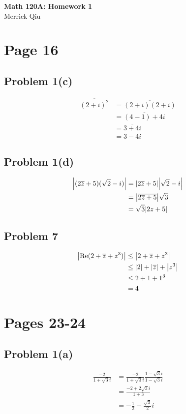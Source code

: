 \documentclass{article}
\newcommand{\cjg}[1]{\overline{#1}}
\begin{document}
\begin{center}
	\huge{\bf Math 120A: Homework 1} \\
	Merrick Qiu
\end{center}
\section*{Page 16}
\subsection*{Problem 1(c)}
\begin{align*}
	\overline{(2+i)^2} &= \overline{(2+i)(2+i)}\\
	&= \overline{(4-1)+4i} \\
	&= \overline{3+4i} \\
	&= 3-4i
\end{align*}

\subsection*{Problem 1(d)}
\begin{align*}
	\abs{(2\cjg{z}+5)(\sqrt{2}-i)} &= \abs{2\cjg{z}+5}\abs{\sqrt{2}-i}\\
	&= \abs{\cjg{2\cjg{z}+5}}\sqrt{3} \\
	&= \sqrt{3} \abs{2z+5}
\end{align*}

\subsection*{Problem 7}
\begin{align*}
	\abs{\Re(2+\cjg{z}+z^3)} &\leq \abs{2+\cjg{z}+z^3} \\
	&\leq \abs{2} + \abs{\cjg{z}} + \abs{z^3} \\
	&\leq 2 + 1 + 1^3 \\
	&= 4
\end{align*}
\newpage 

\section*{Pages 23-24}
\subsection*{Problem 1(a)}
\begin{align*}
	\frac{-2}{1+\sqrt{3} i} &= \frac{-2}{1+\sqrt{3} i}\frac{1-\sqrt{3} i}{1-\sqrt{3} i}\\
	&= \frac{-2+2\sqrt{3}i}{1+3} \\
	&= -\frac{1}{2} + \frac{\sqrt{3}}{2} i
\end{align*}
\end{document}
